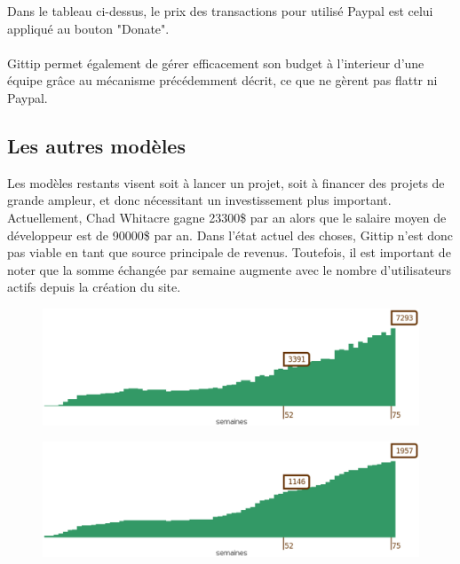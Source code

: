 Dans le tableau ci-dessus, le prix des transactions pour utilisé Paypal est
celui appliqué au bouton "Donate".


\paragraph{}
Gittip permet également de gérer efficacement son budget à l'interieur d'une
équipe grâce au mécanisme précédemment décrit, ce que ne gèrent pas flattr ni
Paypal.

\subsection{Les autres modèles}

Les modèles restants visent soit à lancer un projet, soit à financer des projets
de grande ampleur, et donc nécessitant un investissement plus important.
Actuellement, Chad Whitacre gagne 23300\$ par an alors que le salaire moyen de
développeur est de 90000\$ par an. Dans l'état actuel des choses, Gittip n'est
donc pas viable en tant que source principale de revenus. Toutefois, il est
important de noter que la somme échangée par semaine augmente avec le nombre
d'utilisateurs actifs depuis la création du site.

\begin{figure}[h!]
  \centering
    \includegraphics[width=16cm]{images/gittip_amount.eps}
\end{figure}
\begin{figure}[h!]
  \centering
    \includegraphics[width=16cm]{images/gittip_user.eps}
\end{figure}

